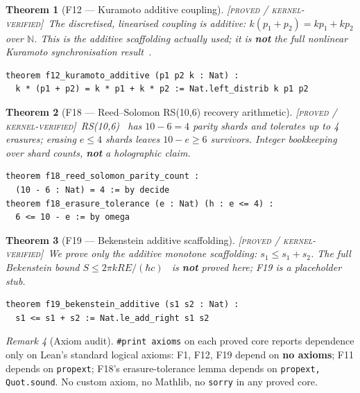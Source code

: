 \documentclass[11pt]{article}
\theoremstyle{plain}
\newtheorem{theorem}{Theorem}[section]
\theoremstyle{definition}
\theoremstyle{remark}
\newtheorem{remark}[theorem]{Remark}
\newcommand{\statusLocked}{\textcolor{szlteal}{\textsc{[proved / kernel-verified]}}}
\begin{document}
\begin{theorem}[F12 --- Kuramoto additive coupling]\statusLocked\ The discretised,
linearised coupling is additive: $k(p_1+p_2)=kp_1+kp_2$ over $\mathbb{N}$. This is the
additive scaffolding actually used; it is \textbf{not} the full nonlinear Kuramoto
synchronisation result~\cite{kuramoto1975}.
\end{theorem}
\begin{lstlisting}
theorem f12_kuramoto_additive (p1 p2 k : Nat) :
  k * (p1 + p2) = k * p1 + k * p2 := Nat.left_distrib k p1 p2
\end{lstlisting}

\begin{theorem}[F18 --- Reed--Solomon RS(10,6) recovery arithmetic]\statusLocked\
RS(10,6)~\cite{reedsolomon1960} has $10-6=4$ parity shards and tolerates up to 4
erasures; erasing $e\le 4$ shards leaves $10-e\ge 6$ survivors. Integer bookkeeping over
shard counts, \textbf{not} a holographic claim.
\end{theorem}
\begin{lstlisting}
theorem f18_reed_solomon_parity_count :
  (10 - 6 : Nat) = 4 := by decide
theorem f18_erasure_tolerance (e : Nat) (h : e <= 4) :
  6 <= 10 - e := by omega
\end{lstlisting}

\begin{theorem}[F19 --- Bekenstein additive scaffolding]\statusLocked\ We prove only the
additive monotone scaffolding: $s_1\le s_1+s_2$. The full Bekenstein bound
$S\le 2\pi kRE/(\hbar c)$~\cite{bekenstein1981} is \textbf{not} proved here; F19 is a
placeholder stub.
\end{theorem}
\begin{lstlisting}
theorem f19_bekenstein_additive (s1 s2 : Nat) :
  s1 <= s1 + s2 := Nat.le_add_right s1 s2
\end{lstlisting}

\begin{remark}[Axiom audit]
\texttt{\#print axioms} on each proved core reports dependence only on Lean's standard
logical axioms: F1, F12, F19 depend on \textbf{no axioms}; F11 depends on
\texttt{propext}; F18's erasure-tolerance lemma depends on \texttt{propext, Quot.sound}.
No custom axiom, no Mathlib, no \texttt{sorry} in any proved core.
\end{remark}
\end{document}
